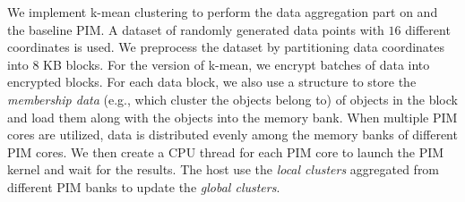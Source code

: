 

We implement k-mean clustering to perform the data aggregation part on \thename and the baseline PIM. A dataset of randomly generated data points with $16$ different coordinates is used. We preprocess the dataset by partitioning data coordinates into $8$ KB blocks. For the \thename version of k-mean, we encrypt batches of data into encrypted blocks. For each data block, we also use a structure to store the \emph{membership data} (e.g., which cluster the objects belong to) of objects in the block and load them along with the objects into the memory bank. When multiple PIM cores are utilized, data is distributed evenly among the memory banks of different PIM cores. We then create a CPU thread for each PIM core to launch the PIM kernel and wait for the results. The host use the \emph{local clusters} aggregated from different PIM banks to update the \emph{global clusters}.

